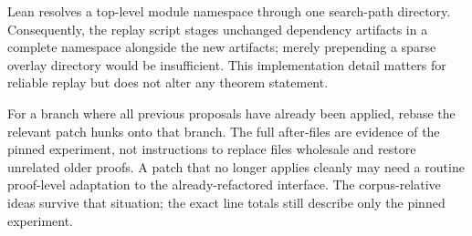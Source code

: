 Lean resolves a top-level module namespace through one search-path directory.
Consequently, the replay script stages unchanged dependency artifacts in a
complete namespace alongside the new artifacts; merely prepending a sparse
overlay directory would be insufficient. This implementation detail matters
for reliable replay but does not alter any theorem statement.

For a branch where all previous proposals have already been applied, rebase
the relevant patch hunks onto that branch. The full after-files are evidence
of the pinned experiment, not instructions to replace files wholesale and
restore unrelated older proofs. A patch that no longer applies cleanly may
need a routine proof-level adaptation to the already-refactored interface.
The corpus-relative ideas survive that situation; the exact line totals
still describe only the pinned experiment.
